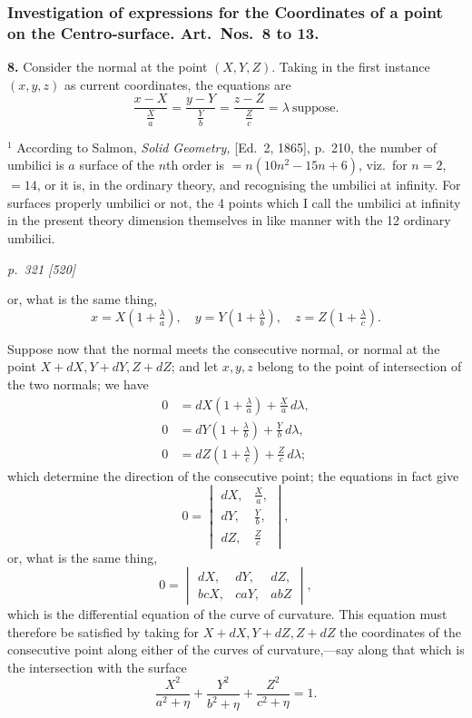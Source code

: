 \documentclass[11pt,a4paper]{article}
\theoremstyle{plain}
\theoremstyle{definition}
\begin{document}
\subsubsection*{Investigation of expressions for the Coordinates of a point on the Centro-surface. Art.\ Nos.\ 8 to 13.}

\textbf{8.} Consider the normal at the point $(X, Y, Z)$. Taking in the first instance $(x, y, z)$ as current coordinates, the equations are
\[
\frac{x - X}{\tfrac{X}{a}} = \frac{y - Y}{\tfrac{Y}{b}} = \frac{z - Z}{\tfrac{Z}{c}} = \lambda \ \text{suppose}.
\]

\smallskip
\footnotesize
$^1$ According to Salmon, \textit{Solid Geometry,} [Ed.\ 2, 1865], p.~210, the number of umbilici is $a$ surface of the $n$th order is $= n(10n^2 - 15n + 6)$, viz.\ for $n = 2$, $= 14$, or it is, in the ordinary theory, and recognising the umbilici at infinity. For surfaces properly umbilici or not, the 4 points which I call the umbilici at infinity in the present theory dimension themselves in like manner with the 12 ordinary umbilici.

\clearpage

\bigskip
\textit{p.~321 [520]}
\smallskip

or, what is the same thing,
\[
x = X\left(1 + \tfrac{\lambda}{a}\right),\quad y = Y\left(1 + \tfrac{\lambda}{b}\right),\quad z = Z\left(1 + \tfrac{\lambda}{c}\right).
\]

Suppose now that the normal meets the consecutive normal, or normal at the point $X + dX, Y + dY, Z + dZ$; and let $x, y, z$ belong to the point of intersection of the two normals; we have
\begin{align*}
0 &= dX\left(1 + \tfrac{\lambda}{a}\right) + \tfrac{X}{a}\,d\lambda,\\
0 &= dY\left(1 + \tfrac{\lambda}{b}\right) + \tfrac{Y}{b}\,d\lambda,\\
0 &= dZ\left(1 + \tfrac{\lambda}{c}\right) + \tfrac{Z}{c}\,d\lambda;
\end{align*}
which determine the direction of the consecutive point; the equations in fact give
\[
0 = \begin{vmatrix} dX, & \tfrac{X}{a},\\ dY, & \tfrac{Y}{b},\\ dZ, & \tfrac{Z}{c} \end{vmatrix},
\]
or, what is the same thing,
\[
0 = \begin{vmatrix} dX, & dY, & dZ,\\ b cX, & caY, & abZ \end{vmatrix},
\]
which is the differential equation of the curve of curvature. This equation must therefore be satisfied by taking for $X + dX, Y + dZ, Z + dZ$ the coordinates of the consecutive point along either of the curves of curvature,---say along that which is the intersection with the surface
\[
\frac{X^2}{a^2 + \eta} + \frac{Y^2}{b^2 + \eta} + \frac{Z^2}{c^2 + \eta} = 1.
\]
\end{document}
